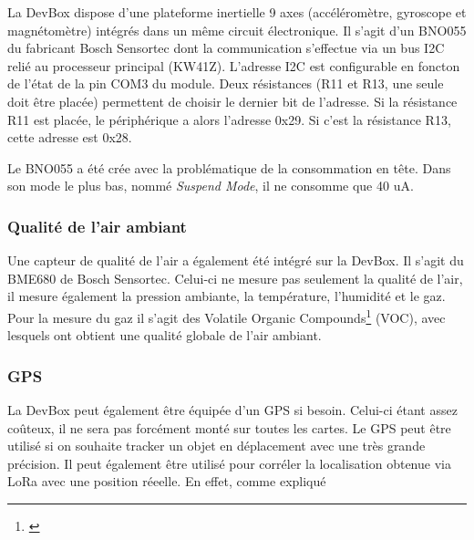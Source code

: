 La DevBox dispose d'une plateforme inertielle 9 axes (accéléromètre, gyroscope et magnétomètre) intégrés dans un même circuit électronique. Il s'agit d'un BNO055 du fabricant Bosch Sensortec dont la communication s'effectue via un bus I2C relié au processeur principal (KW41Z). L'adresse I2C est configurable en foncton de l'état de la pin COM3 du module. Deux résistances (R11 et R13, une seule doit être placée) permettent de choisir le dernier bit de l'adresse. Si la résistance R11 est placée, le périphérique a alors l'adresse 0x29. Si c'est la résistance R13, cette adresse est 0x28.

Le BNO055 a été crée avec la problématique de la consommation en tête. Dans son mode le plus bas, nommé \textit{Suspend Mode}, il ne consomme que 40 uA. 


\subsubsection{Qualité de l'air ambiant}

Une capteur de qualité de l'air a également été intégré sur la DevBox. Il s'agit du BME680 de Bosch Sensortec. Celui-ci ne mesure pas seulement la qualité de l'air, il mesure également la pression ambiante, la température, l'humidité et le gaz. Pour la mesure du gaz il s'agit des Volatile Organic Compounds\footnote{\url{}} (VOC), avec lesquels ont obtient une qualité globale de l'air ambiant.


\subsubsection{GPS}

La DevBox peut également être équipée d'un GPS si besoin. Celui-ci étant assez coûteux, il ne sera pas forcément monté sur toutes les cartes. Le GPS peut être utilisé si on souhaite tracker un objet en déplacement avec une très grande précision.
Il peut également être utilisé pour corréler la localisation obtenue via LoRa avec une position réeelle. En effet, comme expliqué 


